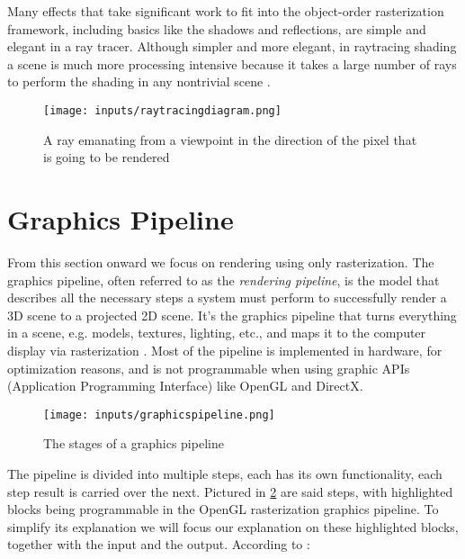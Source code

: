 \documentclass[cic,tc,english]{iiufrgs}
\begin{document}
Many effects that take significant work to fit into the object-order rasterization framework, including basics like the shadows and reflections, are simple and elegant in a ray tracer. Although simpler and more elegant, in raytracing shading a scene is much more processing intensive because it takes a large number of rays to perform the shading in any nontrivial scene \cite{Marschner2021CGFundamentals}.

\begin{figure}[hbt!]
    \caption{A ray emanating from a viewpoint in the direction of the pixel that is going to be rendered}
    \begin{center}
        \texttt{[image: inputs/raytracingdiagram.png]}
    \end{center}
    \label{raytracingdiagram}
\end{figure}


\section{Graphics Pipeline}
\label{graphicspipelinesection}
From this section onward we focus on rendering using only rasterization. The graphics pipeline, often referred to as the \textit{rendering pipeline}, is the model that describes all the necessary steps a system must perform to successfully render a 3D scene to a projected 2D scene. It's the graphics pipeline that turns everything in a scene, e.g. models, textures, lighting, etc., and maps it to the computer display via rasterization \cite{Marschner2021CGFundamentals}. Most of the pipeline is implemented in hardware, for optimization reasons, and is not programmable when using graphic APIs (Application Programming Interface) like OpenGL and DirectX.

\begin{figure}[hbt!]
    \caption{The stages of a graphics pipeline \cite{Marschner2021CGFundamentals}}
    \begin{center}
        \texttt{[image: inputs/graphicspipeline.png]}
    \end{center}
    \label{graphicspipelinestages}
\end{figure}

The pipeline is divided into multiple steps, each has its own functionality, each step result is carried over the next. Pictured in  \cref{graphicspipelinestages} are said steps, with highlighted blocks being programmable in the OpenGL rasterization graphics pipeline. To simplify its explanation we will focus our explanation on these highlighted blocks, together with the input and the output. According to \citet{Marschner2021CGFundamentals}:
\end{document}
